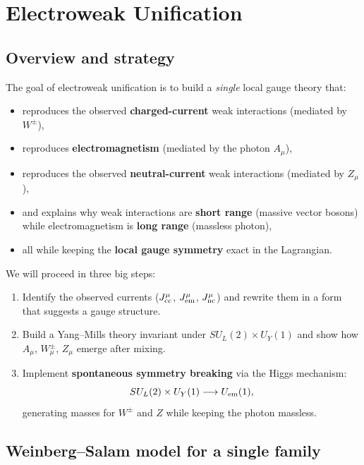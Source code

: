 \chapter{Electroweak Unification}
\label{ch:electroweak-unification}

\section{Overview and strategy}
The goal of electroweak unification is to build a \emph{single} local gauge theory that:
\begin{itemize}
  \item reproduces the observed \textbf{charged-current} weak interactions (mediated by $W^\pm$),
  \item reproduces \textbf{electromagnetism} (mediated by the photon $A_\mu$),
  \item reproduces the observed \textbf{neutral-current} weak interactions (mediated by $Z_\mu$),
  \item and explains why weak interactions are \textbf{short range} (massive vector bosons)
        while electromagnetism is \textbf{long range} (massless photon),
  \item all while keeping the \textbf{local gauge symmetry} exact in the Lagrangian.
\end{itemize}
We will proceed in three big steps:
\begin{enumerate}
  \item Identify the observed currents ($J^\mu_{\rm cc}$, $J^\mu_{\rm em}$, $J^\mu_{\rm nc}$) and rewrite them in a form that suggests a gauge structure.
  \item Build a Yang--Mills theory invariant under $SU_L(2)\times U_Y(1)$ and show how $A_\mu$, $W^\pm_\mu$, $Z_\mu$ emerge after mixing.
  \item Implement \textbf{spontaneous symmetry breaking} via the Higgs mechanism:
        \[
        SU_L(2)\times U_Y(1)\longrightarrow U_{\rm em}(1),
        \]
        generating masses for $W^\pm$ and $Z$ while keeping the photon massless.
\end{enumerate}

\section{Weinberg--Salam model for a single family}
